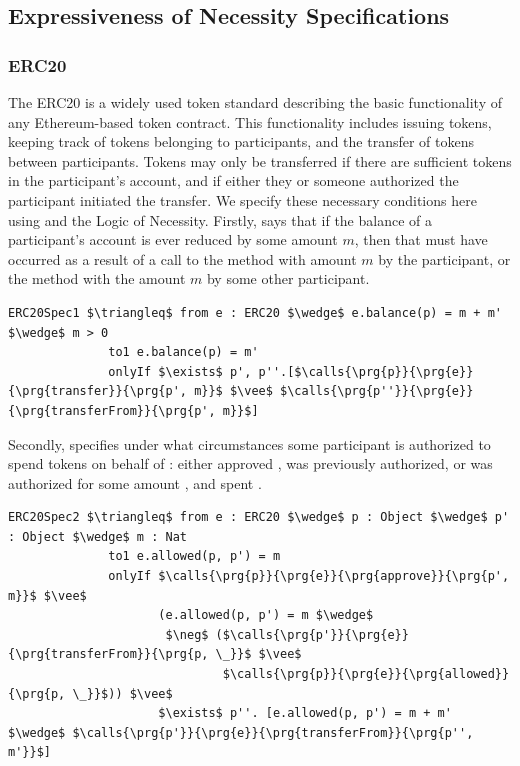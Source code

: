 \subsection{Expressiveness of Necessity Specifications}


\subsubsection{ERC20}
The ERC20 is a widely used token standard describing the basic functionality of any Ethereum-based token 
contract. This functionality includes issuing tokens, keeping track of tokens belonging to participants, and the 
transfer of tokens between participants. Tokens may only be transferred if there are sufficient tokens in the 
participant's account, and if either they or someone authorized the participant initiated the transfer. We 
specify these necessary conditions here using \Chainmail and the Logic of Necessity. Firstly,  
says that if the balance of a participant's account is ever reduced by some amount $m$, then
that must have occurred as a result of a call to the  method with amount $m$ by the participant,
or the  method with the amount $m$ by some other participant.
\begin{lstlisting}[language = Chainmail, mathescape=true, frame=lines]
ERC20Spec1 $\triangleq$ from e : ERC20 $\wedge$ e.balance(p) = m + m' $\wedge$ m > 0
              to1 e.balance(p) = m'
              onlyIf $\exists$ p', p''.[$\calls{\prg{p}}{\prg{e}}{\prg{transfer}}{\prg{p', m}}$ $\vee$ $\calls{\prg{p''}}{\prg{e}}{\prg{transferFrom}}{\prg{p', m}}$]
\end{lstlisting}
Secondly,  specifies under what circumstances some participant  is authorized to 
spend  tokens on behalf of : either  approved ,  was previously authorized,
or  was authorized for some amount , and spent .
\begin{lstlisting}[language = Chainmail, mathescape=true, frame=lines]
ERC20Spec2 $\triangleq$ from e : ERC20 $\wedge$ p : Object $\wedge$ p' : Object $\wedge$ m : Nat
              to1 e.allowed(p, p') = m
              onlyIf $\calls{\prg{p}}{\prg{e}}{\prg{approve}}{\prg{p', m}}$ $\vee$ 
                     (e.allowed(p, p') = m $\wedge$ 
                      $\neg$ ($\calls{\prg{p'}}{\prg{e}}{\prg{transferFrom}}{\prg{p, \_}}$ $\vee$ 
                              $\calls{\prg{p}}{\prg{e}}{\prg{allowed}}{\prg{p, \_}}$)) $\vee$
                     $\exists$ p''. [e.allowed(p, p') = m + m' $\wedge$ $\calls{\prg{p'}}{\prg{e}}{\prg{transferFrom}}{\prg{p'', m'}}$]
\end{lstlisting}

